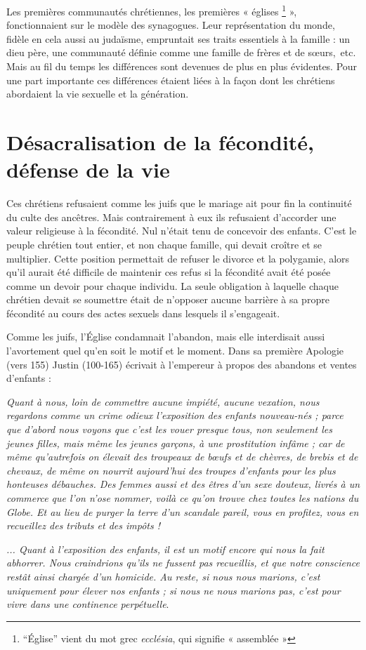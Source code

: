  Les premières communautés chrétiennes, les premières « églises
\footnote{\enquote{Église} vient du mot grec \emph{ecclésia}, qui signifie « assemblée »}
», fonctionnaient sur le modèle des synagogues. Leur représentation du monde, fidèle en cela aussi au judaïsme, empruntait ses traits essentiels à la famille : un dieu père, une communauté définie comme une famille de frères et de sœurs,~etc. Mais au fil du temps les différences sont devenues de plus en plus évidentes. Pour une part importante ces différences étaient liées à la façon dont les chrétiens abordaient la vie sexuelle et la génération.

\section{Désacralisation de la fécondité, défense de la vie}

 Ces chrétiens refusaient comme les juifs que le mariage ait pour fin la continuité du culte des ancêtres. Mais contrairement à eux ils refusaient d'accorder une valeur religieuse à la fécondité. Nul n'était tenu de concevoir des enfants. C'est le peuple chrétien tout entier, et non chaque famille, qui devait croître et se multiplier. Cette position permettait de refuser le divorce et la polygamie, alors qu'il aurait été difficile de maintenir ces refus si la fécondité avait été posée comme un devoir pour chaque individu. La seule obligation à laquelle chaque chrétien devait se soumettre était de n'opposer aucune barrière à sa propre fécondité au cours des actes sexuels dans lesquels il s'engageait. 

 Comme les juifs, l'Église condamnait l'abandon, mais elle interdisait aussi l'avortement quel qu'en soit le motif et le moment. Dans sa première Apologie (vers 155) Justin (100-165) écrivait à l'empereur à propos des abandons et ventes d'enfants :

\begin{displayquote}
\emph{Quant à nous, loin de commettre aucune impiété, aucune vexation, nous regardons comme un crime odieux l'exposition des enfants nouveau-nés ; parce que d'abord nous voyons que c'est les vouer presque tous, non seulement les jeunes filles, mais même les jeunes garçons, à une prostitution infâme ; car de même qu'autrefois on élevait des troupeaux de bœufs et de chèvres, de brebis et de chevaux, de même on nourrit aujourd'hui des troupes d'enfants pour les plus honteuses débauches. Des femmes aussi et des êtres d'un sexe douteux, livrés à un commerce que l'on n'ose nommer, voilà ce qu'on trouve chez toutes les nations du Globe. Et au lieu de purger la terre d'un scandale pareil, vous en profitez, vous en recueillez des tributs et des impôts !}

 \emph{... Quant à l'exposition des enfants, il est un motif encore qui nous la fait abhorrer. Nous craindrions qu'ils ne fussent pas recueillis, et que notre conscience restât ainsi chargée d'un homicide. Au reste, si nous nous marions, c'est uniquement pour élever nos enfants ; si nous ne nous marions pas, c'est pour vivre dans une continence perpétuelle}.
\end{displayquote}

